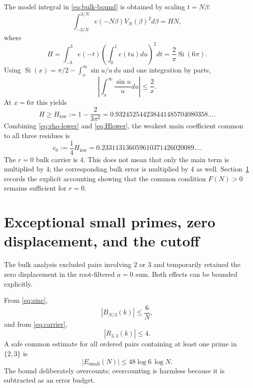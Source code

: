 \documentclass[11pt]{article}
\theoremstyle{definition}
\newcommand{\abs}[1]{\left|#1\right|}
\begin{document}
The model integral in \eqref{eq:bulk-bound} is obtained by scaling $t=N\beta$:
\[
\int_{-3/N}^{3/N}
e(-N\beta)V_N(\beta)^2d\beta
=HN,
\]
where
\begin{equation}\label{eq:H}
H
=\int_{-3}^{3}e(-t)
\left(\int_0^1e(tu)du\right)^2dt
=\frac2\pi\operatorname{Si}(6\pi).
\end{equation}
Using $\operatorname{Si}(x)=\pi/2-\int_x^\infty\sin u/u\,du$ and one integration by parts,
\[
\abs{\int_x^\infty\frac{\sin u}{u}du}\le\frac2x.
\]
At $x=6\pi$ this yields
\begin{equation}\label{eq:Hlower}
\boxed{
H\ge H_{\mathrm{low}}
:=1-\frac2{3\pi^2}
=0.932452544238441485704080358\ldots.
}
\end{equation}
Combining \eqref{eq:rho-lower} and \eqref{eq:Hlower}, the weakest main coefficient common to all three residues is
\begin{equation}\label{eq:c0}
\boxed{
c_0:=\frac14H_{\mathrm{low}}
=0.233113136059610371426020089\ldots.
}
\end{equation}
The $r=0$ bulk carrier is $4$. This does not mean that only the main term is multiplied by $4$; the corresponding bulk error is multiplied by $4$ as well. Section~\ref{sec:exceptions} records the explicit accounting showing that the common condition $F(N)>0$ remains sufficient for $r=0$.

\section{Exceptional small primes, zero displacement, and the cutoff}\label{sec:exceptions}

The bulk analysis excluded pairs involving $2$ or $3$ and temporarily retained the zero displacement in the root-filtered $a=0$ sum. Both effects can be bounded explicitly.

From \eqref{eq:sinc},
\begin{equation}\label{eq:Bbound}
\abs{B_{N/3}(k)}\le\frac6N,
\end{equation}
and from \eqref{eq:carrier},
\begin{equation}\label{eq:Rbound}
\abs{R_{3,3}(k)}\le4.
\end{equation}
A safe common estimate for all ordered pairs containing at least one prime in $\{2,3\}$ is
\begin{equation}\label{eq:small}
\boxed{
\abs{E_{\mathrm{small}}(N)}
\le48\log6\,\log N.
}
\end{equation}
The bound deliberately overcounts; overcounting is harmless because it is subtracted as an error budget.
\end{document}
